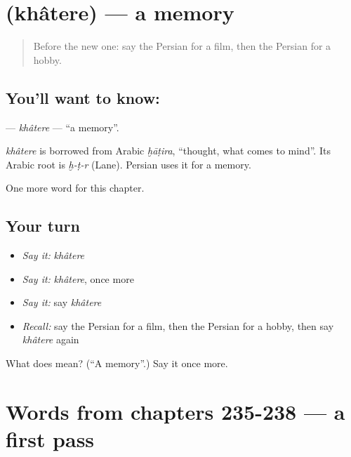 \section[\texorpdfstring{\fa{خاطره} (khâtere)}{خاطره (khâtere)}]{ (khâtere) — a memory}

\label{lesson:FA-C243-khatere}



\begin{quote}
Before the new one: say the Persian for a film, then the Persian for a hobby.
\end{quote}

\subsection*{You'll want to know: }
\textbf{} — \emph{khâtere} — \textquotedblleft{}a memory\textquotedblright{}.

\begin{cousinweb}
\emph{khâtere} is borrowed from Arabic \emph{ḫāṭira}, \textquotedblleft{}thought, what comes to mind\textquotedblright{}. Its Arabic root is \emph{ḫ-ṭ-r} (Lane). Persian uses it for a memory.
\end{cousinweb}

\begin{grammarlens}[title={What you've built}]
One more word for this chapter.
\end{grammarlens}

\subsection*{Your turn}
\begin{itemize}
\raggedright
  \item \emph{Say it:} \emph{khâtere}
  \item \emph{Say it:} \emph{khâtere}, once more
  \item \emph{Say it:} say \emph{khâtere}
  \item \emph{Recall:} say the Persian for a film, then the Persian for a hobby, then say \emph{khâtere} again
\end{itemize}

\begin{tcolorbox}[breakable,colback=teal!4,colframe=teal!35!black,title={Before you move on}]
What does  mean? (\textquotedblleft{}A memory\textquotedblright{}.) Say it once more.
\end{tcolorbox}
\section[(dialogue)]{Words from chapters 235-238 — a first pass}

